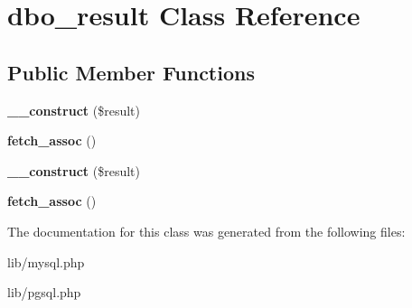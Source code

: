\hypertarget{classdbo__result}{\section{dbo\-\_\-result Class Reference}
\label{classdbo__result}
}
\subsection*{Public Member Functions}
\begin{DoxyCompactItemize}
\item 
\hypertarget{classdbo__result_adf85f6c8d207638032b04ca46c8b20b2}{{\bfseries \-\_\-\-\_\-construct} (\$result)}\label{classdbo__result_adf85f6c8d207638032b04ca46c8b20b2}

\item 
\hypertarget{classdbo__result_a4a5b7f88c22205d6f504ac370f198817}{{\bfseries fetch\-\_\-assoc} ()}\label{classdbo__result_a4a5b7f88c22205d6f504ac370f198817}

\item 
\hypertarget{classdbo__result_adf85f6c8d207638032b04ca46c8b20b2}{{\bfseries \-\_\-\-\_\-construct} (\$result)}\label{classdbo__result_adf85f6c8d207638032b04ca46c8b20b2}

\item 
\hypertarget{classdbo__result_a4a5b7f88c22205d6f504ac370f198817}{{\bfseries fetch\-\_\-assoc} ()}\label{classdbo__result_a4a5b7f88c22205d6f504ac370f198817}

\end{DoxyCompactItemize}


The documentation for this class was generated from the following files\-:\begin{DoxyCompactItemize}
\item 
lib/mysql.\-php\item 
lib/pgsql.\-php\end{DoxyCompactItemize}
